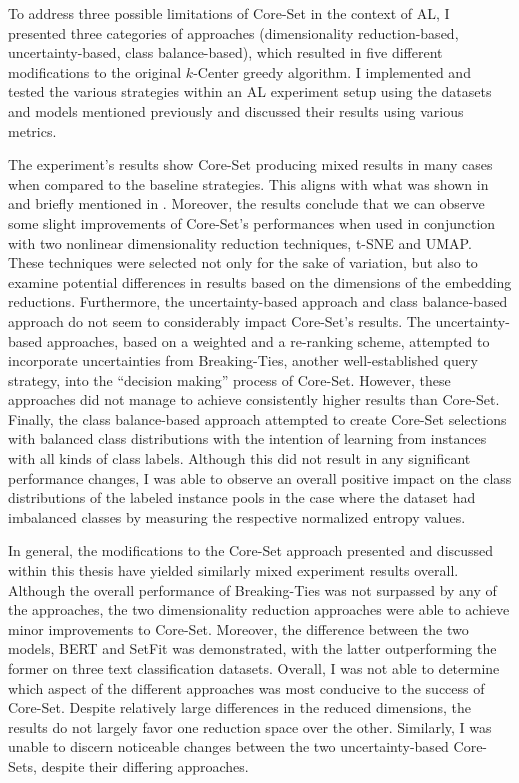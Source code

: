 \documentclass[english,bachelor,ul]{webisthesis} %
\begin{document}
To address three possible limitations of Core-Set in the context of AL, I presented three categories of approaches (dimensionality reduction-based, uncertainty-based, class balance-based), which resulted in five different modifications to the original $k$-Center greedy algorithm. I implemented and tested the various strategies within an AL experiment setup using the datasets and models mentioned previously and discussed their results using various metrics. 

The experiment's results show Core-Set producing mixed results in many cases when compared to the baseline strategies. This aligns with what was shown in \cite{DBLP:conf/kdd/0002MM21} and briefly mentioned in \cite{DBLP:conf/aaai/ColemanCKCBBNSZ22}. Moreover, the results conclude that we can observe some slight improvements of Core-Set's performances when used in conjunction with two nonlinear dimensionality reduction techniques, t-SNE and UMAP. These techniques were selected not only for the sake of variation, but also to examine potential differences in results based on the dimensions of the embedding reductions. Furthermore, the uncertainty-based approach and class balance-based approach do not seem to considerably impact Core-Set's results. The uncertainty-based approaches, based on a weighted and a re-ranking scheme, attempted to incorporate uncertainties from Breaking-Ties, another well-established query strategy, into the ``decision making'' process of Core-Set. However, these approaches did not manage to achieve consistently higher results than Core-Set. Finally, the class balance-based approach attempted to create Core-Set selections with balanced class distributions with the intention of learning from instances with all kinds of class labels. Although this did not result in any significant performance changes, I was able to observe an overall positive impact on the class distributions of the labeled instance pools in the case where the dataset had imbalanced classes by measuring the respective normalized entropy values.

In general, the modifications to the Core-Set approach presented and discussed within this thesis have yielded similarly mixed experiment results overall. Although the overall performance of Breaking-Ties was not surpassed by any of the approaches, the two dimensionality reduction approaches were able to achieve minor improvements to Core-Set. Moreover, the difference between the two models, BERT and SetFit was demonstrated, with the latter outperforming the former on three text classification datasets. Overall, I was not able to determine which aspect of the different approaches was most conducive to the success of Core-Set. Despite relatively large differences in the reduced dimensions, the results do not largely favor one reduction space over the other. Similarly, I was unable to discern noticeable changes between the two uncertainty-based Core-Sets, despite their differing approaches.
\end{document}
